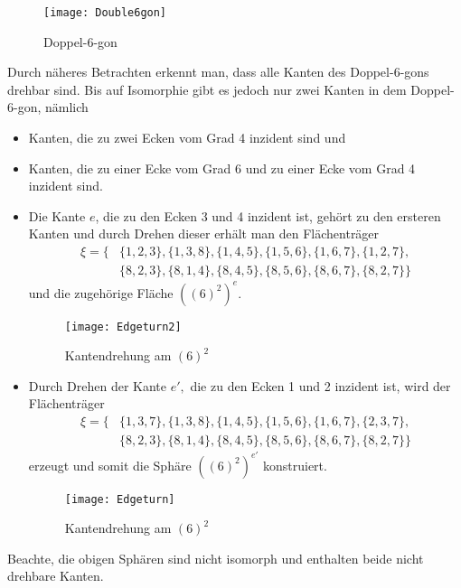 \documentclass[12pt,titlepage,twoside,cleardoublepage]{article}
\theoremstyle{nummermitklammern}
\numberwithin{equation}{section}
\begin{document}
\begin{figure}[H]
\begin{center}
\texttt{[image: Double6gon]}
\end{center}
\caption{Doppel-6-gon }
\end{figure}
Durch näheres Betrachten erkennt man, dass alle Kanten des Doppel-6-gons drehbar sind. Bis auf Isomorphie gibt es jedoch nur zwei Kanten in dem Doppel-6-gon, nämlich 
\begin{itemize}
\item Kanten, die zu zwei Ecken vom Grad 4 inzident sind und
\item Kanten, die zu einer Ecke vom Grad 6 und zu einer Ecke vom Grad 4 inzident sind.
\end{itemize}
\begin{itemize}
\item Die Kante $e$, die zu den Ecken 3 und 4 inzident ist, gehört zu den ersteren Kanten und durch Drehen dieser erhält man den Flächenträger 
\begin{align*}
\xi=\{&\{1,2,3\},\{1,3,8\},\{1,4,5\},\{1,5,6\},\{1,6,7\},\{1,2,7\},\\ 
&\{8,2,3\},\{8,1,4\},\{8,4,5\},\{8,5,6\},\{8,6,7\},\{8,2,7\}\}
\end{align*}
und die zugehörige Fläche ${((6)^2)}^e.$
\begin{figure}[H]
\begin{center}
\texttt{[image: Edgeturn2]}
\end{center}
\caption{Kantendrehung am $(6)^2$ }
\end{figure}
\item Durch Drehen der Kante $e',$ die zu den Ecken 1 und 2 inzident ist, wird der Flächenträger 
\begin{align*}
\xi=\{&\{1,3,7\},\{1,3,8\},\{1,4,5\},\{1,5,6\},\{1,6,7\},\{2,3,7\},\\ 
&\{8,2,3\},\{8,1,4\},\{8,4,5\},\{8,5,6\},\{8,6,7\},\{8,2,7\}\}
\end{align*}
erzeugt und somit die Sphäre ${((6)^2)}^{e'}$ konstruiert.
\begin{figure}[H]
\begin{center}
\texttt{[image: Edgeturn]}
\end{center}
\caption{Kantendrehung am $(6)^2$ }
\end{figure}
\end{itemize}
Beachte, die obigen Sphären sind nicht isomorph und enthalten beide nicht drehbare Kanten.
\end{document}

